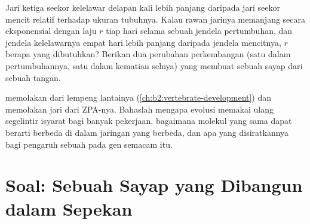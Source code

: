 \begin{exercise}[$\star\star\star$]\label{exo:b2:limb-organogenesis:11}
Jari ketiga seekor kelelawar delapan kali lebih panjang daripada jari
seekor mencit relatif terhadap ukuran tubuhnya. Kalau rawan jarinya
memanjang secara eksponensial dengan laju $r$ tiap hari selama sebuah
jendela pertumbuhan, dan jendela kelelawarnya empat hari lebih panjang
daripada jendela mencitnya, $r$ berapa yang dibutuhkan? Berikan dua
perubahan perkembangan (satu dalam pertumbuhannya, satu dalam kematian
selnya) yang membuat sebuah sayap dari sebuah tangan.
\end{exercise}

\begin{exercise}[$\star\star\star$]\label{exo:b2:limb-organogenesis:12}
 memolakan  dari lempeng lantainya
(\cref{ch:b2:vertebrate-development}) dan memolakan jari dari ZPA-nya.
Bahaslah mengapa evolusi memakai ulang segelintir isyarat bagi banyak
pekerjaan, bagaimana molekul yang sama dapat berarti berbeda di dalam
jaringan yang berbeda, dan apa yang disiratkannya bagi pengaruh sebuah
 pada gen semacam itu.
\end{exercise}

\section{Soal: Sebuah Sayap yang Dibangun dalam Sepekan}

